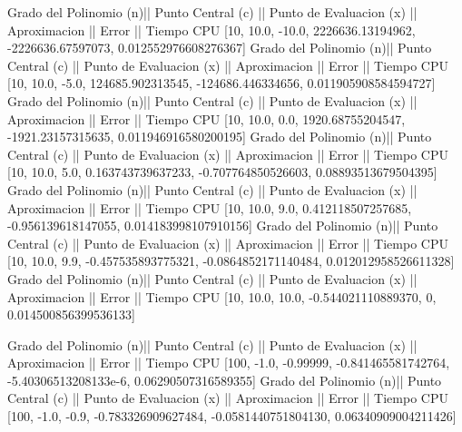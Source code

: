 Grado del Polinomio (n)|| Punto Central (c) || Punto de Evaluacion (x) || Aproximacion || Error || Tiempo CPU 
 [10, 10.0, -10.0, 2226636.13194962, -2226636.67597073, 0.012552976608276367]
Grado del Polinomio (n)|| Punto Central (c) || Punto de Evaluacion (x) || Aproximacion || Error || Tiempo CPU 
 [10, 10.0, -5.0, 124685.902313545, -124686.446334656, 0.011905908584594727]
Grado del Polinomio (n)|| Punto Central (c) || Punto de Evaluacion (x) || Aproximacion || Error || Tiempo CPU 
 [10, 10.0, 0.0, 1920.68755204547, -1921.23157315635, 0.011946916580200195]
Grado del Polinomio (n)|| Punto Central (c) || Punto de Evaluacion (x) || Aproximacion || Error || Tiempo CPU 
 [10, 10.0, 5.0, 0.163743739637233, -0.707764850526603, 0.08893513679504395]
Grado del Polinomio (n)|| Punto Central (c) || Punto de Evaluacion (x) || Aproximacion || Error || Tiempo CPU 
 [10, 10.0, 9.0, 0.412118507257685, -0.956139618147055, 0.014183998107910156]
Grado del Polinomio (n)|| Punto Central (c) || Punto de Evaluacion (x) || Aproximacion || Error || Tiempo CPU 
 [10, 10.0, 9.9, -0.457535893775321, -0.0864852171140484, 0.012012958526611328]
Grado del Polinomio (n)|| Punto Central (c) || Punto de Evaluacion (x) || Aproximacion || Error || Tiempo CPU 
 [10, 10.0, 10.0, -0.544021110889370, 0, 0.014500856399536133]

Grado del Polinomio (n)|| Punto Central (c) || Punto de Evaluacion (x) || Aproximacion || Error || Tiempo CPU 
 [100, -1.0, -0.99999, -0.841465581742764, -5.40306513208133e-6, 0.06290507316589355]
Grado del Polinomio (n)|| Punto Central (c) || Punto de Evaluacion (x) || Aproximacion || Error || Tiempo CPU 
 [100, -1.0, -0.9, -0.783326909627484, -0.0581440751804130, 0.06340909004211426]

